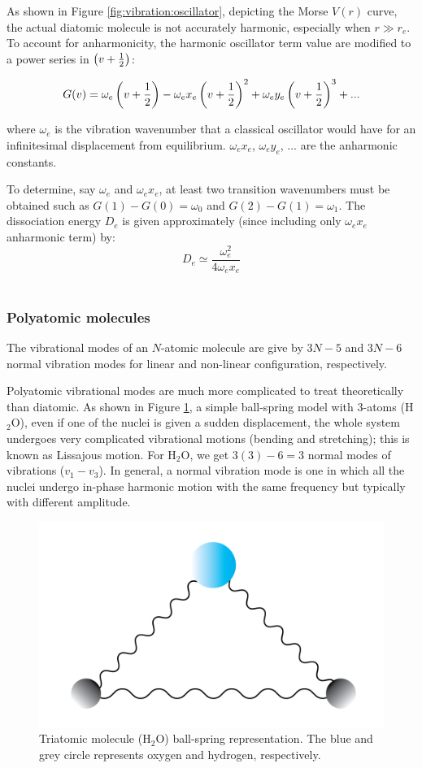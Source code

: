 As shown in Figure \ref{fig:vibration:oscillator}, depicting the Morse $V(r)$ curve, the actual diatomic molecule is not accurately harmonic, especially when $r \gg r_e$. To account for anharmonicity, the harmonic oscillator term value are modified to a power series in $\left( v + \frac{1}{2} \right)$:

\[G(v) = \omega_e \left( v + \frac{1}{2} \right) - \omega_e x_e \left( v + \frac{1}{2} \right)^2 + \omega_e y_e \left( v + \frac{1}{2} \right)^3 + ...\]

where $\omega_e$ is the vibration wavenumber that a classical oscillator would have for an infinitesimal displacement from equilibrium. $\omega_e x_e$, $\omega_e y_e$, ... are the anharmonic constants.

To determine, say $\omega_e$ and $\omega_e x_e$, at least two transition wavenumbers must be obtained such as $G(1)-G(0)=\omega_0$ and $G(2)-G(1)=\omega_1$. The dissociation energy $D_e$ is given approximately (since including only $\omega_e x_e$ anharmonic term) by:
\[D_e \simeq \frac{\omega_e^2}{4\omega_e x_e}\]\\

\subsubsection{Polyatomic molecules}
\label{sec:mol-vibration:polyatomic}
The vibrational modes of an  $N$-atomic molecule are give by $3N-5$ and $3N-6$ normal vibration modes for linear and non-linear configuration, respectively.

Polyatomic vibrational modes are much more complicated to treat theoretically than diatomic. As shown in Figure \ref{fig:oscillator:water}, a simple ball-spring model with 3-atoms (H$_2$O), even if one of the nuclei is given a sudden displacement, the whole system undergoes very complicated vibrational motions (bending and stretching); this is known as Lissajous motion. For H$_2$O, we get $3(3)-6=3$ normal modes of vibrations ($v_1-v_3$). In general, a normal vibration mode is one in which all the nuclei undergo in-phase harmonic motion with the same frequency but typically with different amplitude.
\begin{figure}[!htb]
    \centering
    \includegraphics[scale=0.7]{figures/methods/harmonic-oscillator_polyatomic.png}
    \caption{Triatomic molecule (H$_2$O) ball-spring representation. The blue and grey circle represents oxygen and hydrogen, respectively.}
    \label{fig:oscillator:water}
\end{figure}

